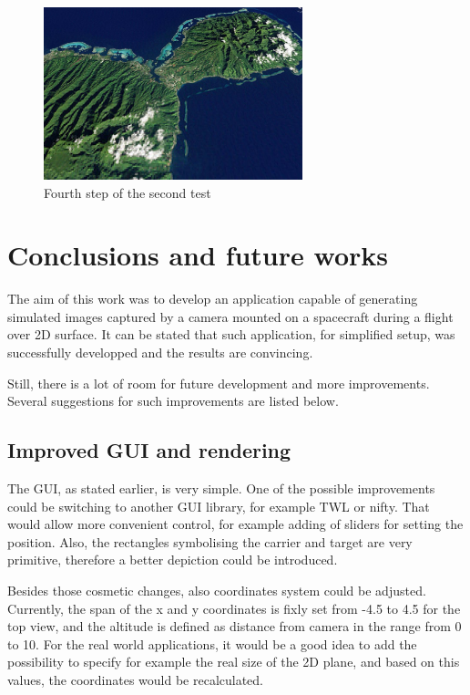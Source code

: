 \documentclass[english,12pt,a4paper,pdftex,elec,utf8]{aaltothesis}
\begin{document}
\begin{figure}[htb]
\centering \includegraphics[height=5cm]{screenshot3.jpg}
\caption{Fourth step of the second test\label{screenshot3Test2}}
\end{figure}

\clearpage

\section{Conclusions and future works} 

The aim of this work was to develop an application capable of generating simulated images captured by a camera mounted on a spacecraft during a flight over 2D surface. It can be stated that such application, for simplified setup, was successfully developped and the results are convincing.

Still, there is a lot of room for future development and more improvements. Several suggestions for such improvements are listed below.


\subsection*{Improved GUI and rendering}

The GUI, as stated earlier, is very simple. One of the possible improvements could be switching to another GUI library, for example TWL\cite{TWL} or nifty\cite{Nifty}. That would allow more convenient control, for example adding of sliders for setting the position. Also, the rectangles symbolising the carrier and target are very primitive, therefore a better depiction could be introduced.

Besides those cosmetic changes, also coordinates system could be adjusted. Currently, the span of the x and y coordinates is fixly set from -4.5 to 4.5 for the top view, and the altitude is defined as distance from camera in the range from 0 to 10. For the real world applications, it would be a good idea to add the possibility to specify for example the real size of the 2D plane, and based on this values, the coordinates would be recalculated.
\end{document}
